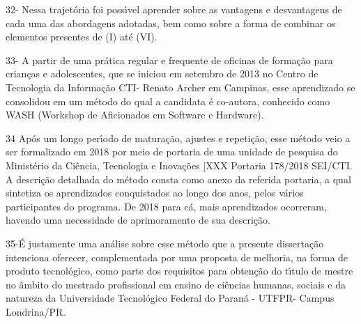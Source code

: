 \documentclass[
12pt,		%
openright,	%
twoside,  %
a4paper,			%
chapter=TITLE,		%
english,			%
french,				%
spanish,			%
brazil				%
]{USPSC-classe/USPSC}
\begin{document}
32- Nessa trajet\'oria foi poss\'{\i}vel aprender sobre as vantagens e desvantagens de cada uma das abordagens adotadas, bem como sobre a forma de combinar os elementos presentes de (I) at\'e (VI).


33- A partir de uma pr\'atica regular e frequente de oficinas de forma\c{c}\~ao para  crian\c{c}as e adolescentes, que se iniciou em setembro de 2013 no Centro de Tecnologia da Informa\c{c}\~ao CTI- Renato Archer em Campinas, esse aprendizado se consolidou em um m\'etodo do qual a candidata \'e co-autora, conhecido como WASH (Workshop de Aficionados em Software e Hardware).


34 Ap\'os um longo per\'{\i}odo de matura\c{c}\~ao, ajustes e repeti\c{c}\~ao, esse m\'etodo veio a ser formalizado em 2018 por meio de portaria de uma unidade de pesquisa do Minist\'erio da Ci\^encia, Tecnologia e Inova\c{c}\~oes [XXX Portaria 178/2018 SEI/CTI. A descri\c{c}\~ao detalhada do m\'etodo consta como anexo da referida portaria, a qual sintetiza os aprendizados conquistados ao longo dos anos, pelos v\'arios participantes do programa. De 2018 para c\'a, mais aprendizados ocorreram, havendo uma necessidade de aprimoramento de sua descri\c{c}\~ao.


35-\'E justamente uma an\'alise sobre esse m\'etodo que a presente disserta\c{c}\~ao intenciona oferecer, complementada por uma proposta de melhoria, na forma de produto tecnol\'ogico, como parte dos requisitos para obten\c{c}\~ao do t\'{\i}tulo de mestre no \^ambito do mestrado profissional em ensino de ci\^encias humanas, sociais e da natureza da Universidade  Tecnol\'ogico  Federal do Paran\'a - UTFPR- Campus Londrina/PR.
\end{document}
